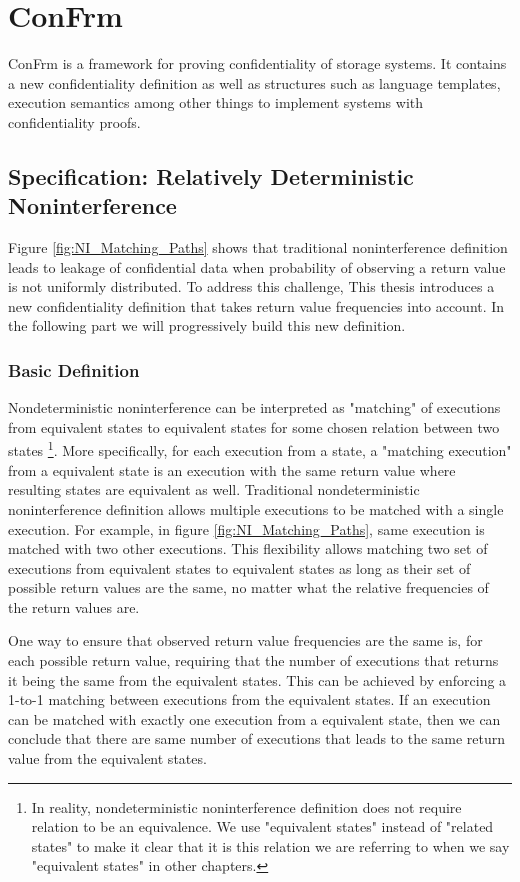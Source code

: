 
\chapter{ConFrm}
ConFrm is a framework for proving confidentiality of storage systems. It contains a new confidentiality definition as well as structures such as language templates, execution semantics among other things to implement systems with confidentiality proofs. 

\section{Specification: Relatively Deterministic Noninterference}
Figure \ref{fig:NI_Matching_Paths} shows that traditional noninterference definition leads to leakage of confidential data when probability of observing a return value is not uniformly distributed. To address this challenge, This thesis introduces a new confidentiality definition that takes return value frequencies into account. In the following part we will progressively build this new definition. 

\subsection{Basic Definition}
Nondeterministic noninterference can be interpreted as "matching" of executions from equivalent states to equivalent states for some chosen relation between two states 
%
\footnote{In reality, nondeterministic noninterference definition does not require relation to be an equivalence. We use "equivalent states" instead of "related states" to make it clear that it is this relation we are referring to when we say "equivalent states" in other chapters.}. 
%
More specifically, for each execution from a state, a "matching execution" from a equivalent state is an execution with the same return value where resulting states are equivalent as well. Traditional nondeterministic noninterference definition allows multiple executions to be matched with a single execution. For example, in figure \ref{fig:NI_Matching_Paths}, same execution is matched with two other executions. This flexibility allows matching two set of executions from equivalent states to equivalent states as long as their set of possible return values are the same, no matter what the relative frequencies of the return values are.

One way to ensure that observed return value frequencies are the same is, for each possible return value, requiring that the number of executions that returns it being the same from the equivalent states. This can be achieved by enforcing a 1-to-1 matching between executions from the equivalent states. If an execution can be matched with exactly one execution from a equivalent state, then we can conclude that there are same number of executions that leads to the same return value from the equivalent states.

